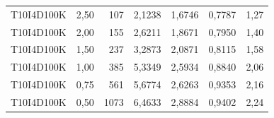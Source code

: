 {\begin{reporttable}
\begin{tabular}{lrrrrrr}
T10I4D100K & 2,50 & 107 & 2,1238 & 1,6746 & 0,7787 & 1,27 \\
T10I4D100K & 2,00 & 155 & 2,6211 & 1,8671 & 0,7950 & 1,40 \\
T10I4D100K & 1,50 & 237 & 3,2873 & 2,0871 & 0,8115 & 1,58 \\
T10I4D100K & 1,00 & 385 & 5,3349 & 2,5934 & 0,8840 & 2,06 \\
T10I4D100K & 0,75 & 561 & 5,6774 & 2,6263 & 0,9353 & 2,16 \\
T10I4D100K & 0,50 & 1073 & 6,4633 & 2,8884 & 0,9402 & 2,24 \\
\bottomrule\end{tabular}
\end{reporttable}
}
